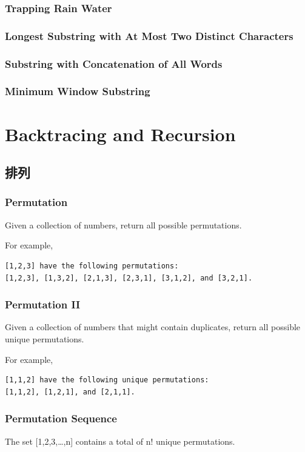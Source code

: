 \documentclass[11pt]{book}
\begin{document}
\subsection{Trapping Rain Water}
\label{sec-15-3-1}
\subsection{Longest Substring with At Most Two Distinct Characters}
\label{sec-15-3-2}
\subsection{Substring with Concatenation of All Words}
\label{sec-15-3-3}
\subsection{Minimum Window Substring}
\label{sec-15-3-4}
\chapter{Backtracing and Recursion}
\label{sec-16}
\section{排列}
\label{sec-16-1}
\subsection{Permutation}
\label{sec-16-1-1}
Given a collection of numbers, return all possible permutations.

For example,
\lstset{language=java,label= ,caption= ,numbers=none}
\begin{lstlisting}
[1,2,3] have the following permutations:
[1,2,3], [1,3,2], [2,1,3], [2,3,1], [3,1,2], and [3,2,1].
\end{lstlisting}
\subsection{Permutation II}
\label{sec-16-1-2}
Given a collection of numbers that might contain duplicates, return all possible unique permutations.

For example,
\lstset{language=java,label= ,caption= ,numbers=none}
\begin{lstlisting}
[1,1,2] have the following unique permutations:
[1,1,2], [1,2,1], and [2,1,1].
\end{lstlisting}
\subsection{Permutation Sequence}
\label{sec-16-1-3}
The set [1,2,3,…,n] contains a total of n! unique permutations.
\end{document}
